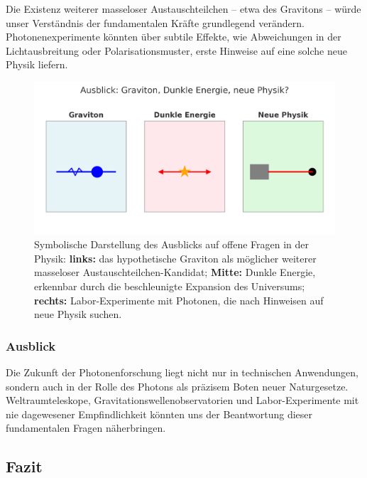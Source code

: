 \begin{tcolorbox}[hypobox, title={Was wäre, wenn das Photon nicht das einzige masselose Boson wäre?}, label={box:photon_neue_physik}]
	\small
	Die Existenz weiterer masseloser Austauschteilchen – etwa des Gravitons – würde unser Verständnis der fundamentalen Kräfte grundlegend verändern. 
	Photonenexperimente könnten über subtile Effekte, wie Abweichungen in der Lichtausbreitung oder Polarisationsmuster, erste Hinweise auf eine solche neue Physik liefern.
\end{tcolorbox}
\begin{figure}[H]
	\centering
	\includegraphics[width=0.9\linewidth]{bilder/photonen_ausblick_fixed.png} %
	\caption{Symbolische Darstellung des Ausblicks auf offene Fragen in der Physik:
		\textbf{links:} das hypothetische Graviton als möglicher weiterer masseloser Austauschteilchen-Kandidat;
		\textbf{Mitte:} Dunkle Energie, erkennbar durch die beschleunigte Expansion des Universums;
		\textbf{rechts:} Labor-Experimente mit Photonen, die nach Hinweisen auf neue Physik suchen.}
	\label{fig:photonen_ausblick}
\end{figure}

\subsubsection{Ausblick}

Die Zukunft der Photonenforschung liegt nicht nur in technischen Anwendungen, sondern auch in der Rolle des Photons als präzisem Boten neuer Naturgesetze. 
Weltraumteleskope, Gravitationswellenobservatorien und Labor-Experimente mit nie dagewesener Empfindlichkeit könnten uns der Beantwortung dieser fundamentalen Fragen näherbringen.

\subsection{Fazit}

